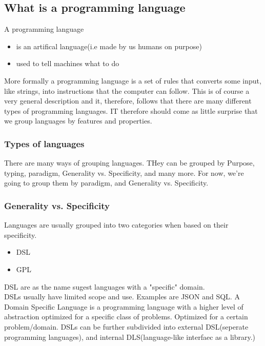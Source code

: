 \documentclass{article}
\begin{document}
    \subsection{What is a programming language}
        A programming language 
        \begin{itemize}
            \item is an artifical language(i.e made by us humans on purpose)
            \item used to tell machines what to do
        \end{itemize}
        More formally a programming language is a set of rules that converts some input, like strings, into instructions that the computer can follow.
        This is of course a very general description and it, therefore, follows that there are many different types of programming languages.
        IT therefore should come as little surprise that we group languages by features and properties. 
        \subsubsection{Types of languages}
        There are many ways of grouping languages. THey can be grouped by Purpose, typing, paradigm, Generality vs. Specificity, and many more.
        For now, we're going to group them by paradigm, and Generality vs. Specificity.
        \subsubsection*{Generality vs. Specificity}
        Languages are usually grouped into two categories when based on their specificity.
        \begin{itemize}
            \item DSL
            \item GPL
        \end{itemize}

        \Gls{DSL} are as the name sugest languages with a "specific" domain.\\
        DSLs usually have limited scope and use. Examples are JSON and SQL.     
        A Domain Specific Language is a programming language with a higher level of abstraction optimized for a specific class of problems. 
        Optimized for a certain problem/domain. 
        DSLs can be further subdivided into external DSL(seperate programming languages), and internal DLS(language-like interfaec as a library.)
\end{document}
